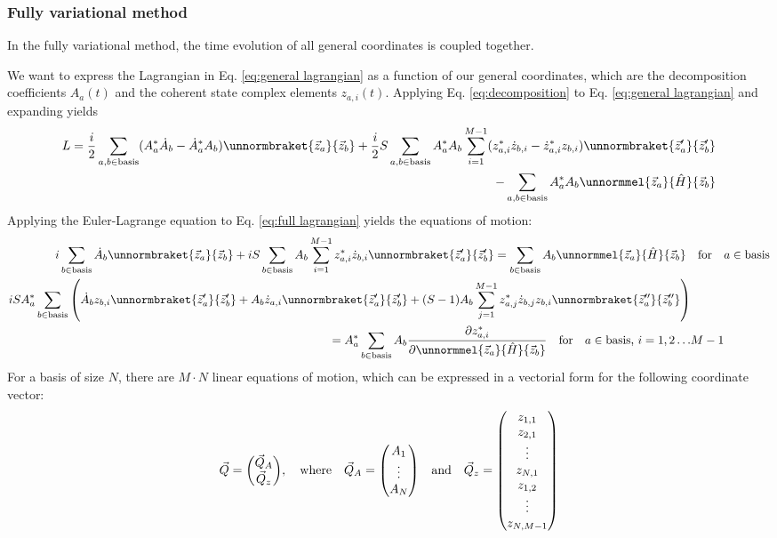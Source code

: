 \documentclass[12pt]{article}
\begin{document}
	\subsubsection{Fully variational method}\label{sec:variational}
	In the fully variational method, the time evolution of all general coordinates is coupled together.
	
	We want to express the Lagrangian in Eq. \ref{eq:general lagrangian} as a function of our general coordinates, which are the decomposition coefficients $A_a(t)$ and the coherent state complex elements $z_{a,i}(t)$. Applying Eq. \ref{eq:decomposition} to Eq. \ref{eq:general lagrangian} and expanding yields
	\begin{align}\label{eq:full lagrangian}
	\begin{split}
	L=\frac{i}{2}\sum_{a,b\in\text{basis}}(A_a^*\dot{A}_b-\dot{A}_a^*A_b)\unnormbraket{\vec{z}_a}{\vec{z}_b}+\frac{i}{2}S\sum_{a,b\in\text{basis}}A_a^*A_b\sum_{i=1}^{M-1}(z_{a,i}^*\dot{z}_{b,i}-\dot{z}^*_{a,i}z_{b,i})\unnormbraket{\vec{z}_a'}{\vec{z}_b'}\\
	-\sum_{a,b\in\text{basis}}A_a^*A_b\unnormmel{\vec{z}_a}{\hat{H}}{\vec{z}_b}
	\end{split}
	\end{align}
	Applying the Euler-Lagrange equation to Eq. \ref{eq:full lagrangian} yields the equations of motion:
	\begin{align}
	i\sum_{b\in\text{basis}}\dot{A}_b\unnormbraket{\vec{z}_a}{\vec{z}_b}+iS\sum_{b\in\text{basis}}A_b\sum_{i=1}^{M-1}z_{a,i}^*\dot{z}_{b,i}\unnormbraket{\vec{z}_a'}{\vec{z}_b'}=\sum_{b\in\text{basis}}A_b\unnormmel{\vec{z}_a}{\hat{H}}{\vec{z}_b}\qq{for}&a\in\text{basis}\\
	\begin{split}
	iSA_a^*\sum_{b\in\text{basis}}\left(\dot{A}_b z_{b,i}\unnormbraket{\vec{z}'_a}{\vec{z}'_b}+A_b\dot{z}_{a,i}\unnormbraket{\vec{z}'_a}{\vec{z}'_b}+(S-1)A_b\sum_{j=1}^{M-1}z_{a,j}^*\dot{z}_{b,j}z_{b,i}\unnormbraket{\vec{z}''_a}{\vec{z}''_b}\right)&\\
	=A_a^*\sum_{b\in\text{basis}}A_b\pdv{z^*_{a,i}}\unnormmel{\vec{z}_a}{\hat{H}}{\vec{z}_b}\qq{for}a\in\text{basis,  } i=1,2\dots &M-1
	\end{split}
	\end{align}
	For a basis of size $N$, there are $M\cdot N$ linear equations of motion, which can be expressed in a vectorial form for the following coordinate vector:
	\begin{equation}
	\vec{Q}=\mqty(\vec{Q}_A\\\vec{Q}_z),\qq{where}\vec{Q}_A=\mqty(A_1\\\vdots\\A_N)\qq{and}\vec{Q}_z=\mqty(z_{1,1}\\z_{2,1}\\\vdots\\z_{N,1}\\z_{1,2}\\\vdots\\z_{N,M-1})
	\end{equation}
\end{document}

